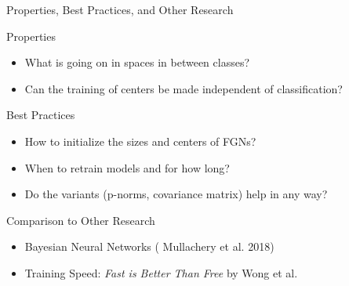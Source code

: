 \documentclass{beamer}
\begin{document}
\begin{frame}{Properties, Best Practices, and Other Research}

    \begin{block}{Properties}
    \begin{itemize}
        \item What is going on in spaces in between classes?
        \item Can the training of centers be made independent of classification?
    \end{itemize}
    \end{block}
    
    \begin{block}{Best Practices}
    \begin{itemize}
        \item How to initialize the sizes and centers of FGNs?
        \item When to retrain models and for how long?
        \item Do the variants (p-norms, covariance matrix) help in any way?
    \end{itemize}
    \end{block}
    
    \begin{block}{Comparison to Other Research}
    \begin{itemize}
        \item Bayesian Neural Networks (\cite{mullachery2018bayesian} Mullachery et al. 2018)
        \item Training Speed: \emph{Fast is Better Than Free} \cite{wong2020fast} by Wong et al.
    \end{itemize}
    
    \end{block}
    
\end{frame}
\end{document}
